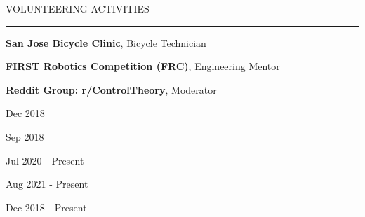 
{
\hspace{-1.72in}\noindent\color{cblue}
{VOLUNTEERING ACTIVITIES} %
}

\vspace{-1.6ex}
{\hspace{-1.73in}\noindent\color{dblue}\rule{6.935in}{0.4pt}} %
\vspace{-2ex}

{\hspace{-1.73in}\small
\textbf{San Jose Bicycle Clinic}, Bicycle Technician }

{\hspace{-1.73in}\small
\textbf{FIRST Robotics Competition (FRC)}, Engineering Mentor }

{\hspace{-1.73in}\small
\textbf{Reddit Group: r/ControlTheory}, Moderator}

\begin{subtitle}
\vspace{-40ex}
{{Dec 2018}}

\vspace{4ex}
{{Sep 2018}}

\vspace{20ex}
{{Jul 2020 - Present}}

{{Aug 2021 - Present}}

{{Dec 2018 - Present}}

\end{subtitle}

